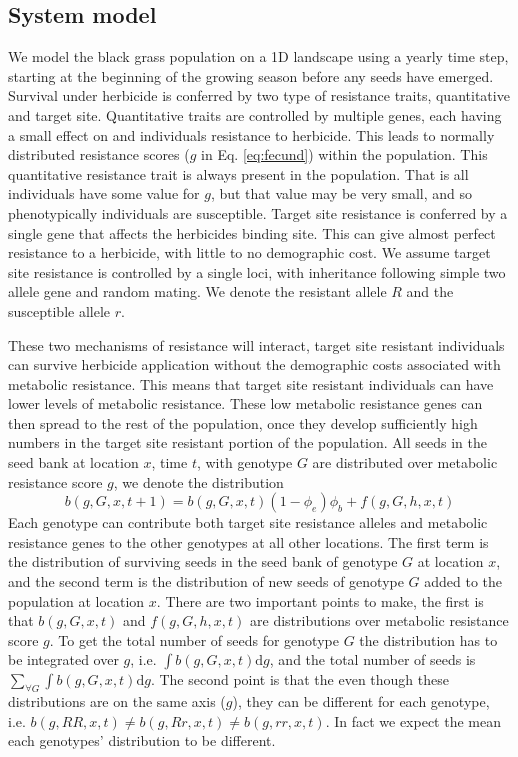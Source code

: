 \documentclass[12pt, a4paper]{article}
\begin{document}
\subsection{System model}
We model the black grass population on a 1D landscape using a yearly time step, starting at the beginning of the growing season before any seeds have emerged. Survival under herbicide is conferred by two type of resistance traits, quantitative and target site. Quantitative traits are controlled by multiple genes, each having a small effect on and individuals resistance to herbicide. This leads to normally distributed resistance scores ($g$ in Eq. \ref{eq:fecund}) within the population. This quantitative resistance trait is always present in the population. That is all individuals have some value for $g$, but that value may be very small, and so phenotypically individuals are susceptible. Target site resistance is conferred by a single gene that affects the herbicides binding site. This can give almost perfect resistance to a herbicide, with little to no demographic cost. We assume target site resistance is controlled by a single loci, with inheritance following simple two allele gene and random mating. We denote the resistant allele $R$ and the susceptible allele $r$. 

These two mechanisms of resistance will interact, target site resistant individuals can survive herbicide application without the demographic costs associated with metabolic resistance. This means that target site resistant individuals can have lower levels of metabolic resistance. These low metabolic resistance genes can then spread to the rest of the population, once they develop sufficiently high numbers in the target site resistant portion of the population. All seeds in the seed bank  at location $x$, time $t$, with genotype $G$ are distributed over metabolic resistance score $g$, we denote the distribution  
\begin{equation}\label{eq:seedbank_simp}
	b(g, G, x, t + 1) = b(g, G, x, t)(1 - \phi_e)\phi_b + f(g, G, h, x, t) 
\end{equation}
Each genotype can contribute both target site resistance alleles and metabolic resistance genes to the other genotypes at all other locations. The first term is the distribution of surviving seeds in the seed bank of genotype $G$ at location $x$, and the second term is the distribution of new seeds of genotype $G$ added to the population at location $x$. There are two important points to make, the first is that $b(g, G, x, t)$ and $f(g, G, h, x, t)$ are distributions over metabolic resistance score $g$. To get the total number of seeds for genotype $G$ the distribution has to be integrated over $g$, i.e. $\int b(g, G, x, t) \text{d}g$, and the total number of seeds is $\sum_{\forall G} \int b(g, G, x, t) \text{d}g$. The second point is that the even though these distributions are on the same axis ($g$), they can be different for each genotype, i.e. $b(g, RR, x, t) \neq b(g, Rr, x, t) \neq b(g, rr, x, t)$. In fact we expect the mean each genotypes' distribution to be different. 
\end{document}
